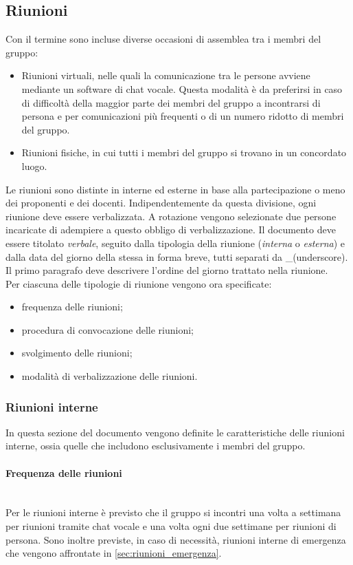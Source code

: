 \subsection{Riunioni}
Con il termine  sono incluse diverse occasioni di assemblea tra i membri del gruppo:
\begin{itemize}
\item Riunioni virtuali, nelle quali la comunicazione tra le persone avviene mediante un software di chat vocale. Questa modalità è da preferirsi in caso di difficoltà della maggior parte dei membri del gruppo a incontrarsi di persona e per comunicazioni più frequenti o di un numero ridotto di membri del gruppo.
\item Riunioni fisiche, in cui tutti i membri del gruppo si trovano in un concordato luogo.	
\end{itemize}
Le riunioni sono distinte in interne ed esterne in base alla partecipazione o meno dei proponenti e dei docenti.
Indipendentemente da questa divisione, ogni riunione deve essere verbalizzata. 
A rotazione vengono selezionate due persone incaricate di adempiere a questo obbligo di verbalizzazione.
Il documento deve essere titolato \textit{verbale}, seguito dalla tipologia della riunione (\textit{interna} o \textit{esterna}) e dalla data del giorno della stessa in forma breve, tutti separati da \_(underscore).\\
Il primo paragrafo deve descrivere l'ordine del giorno trattato nella riunione.\\

Per ciascuna delle tipologie di riunione vengono ora specificate:
\begin{itemize}
	\item frequenza delle riunioni;
	\item procedura di convocazione delle riunioni;
	\item svolgimento delle riunioni;
	\item modalità di verbalizzazione delle riunioni.	 
\end{itemize}

\subsubsection{Riunioni interne}
In questa sezione del documento vengono definite le caratteristiche delle riunioni interne, ossia quelle che includono esclusivamente i membri del gruppo.

\paragraph{Frequenza delle riunioni}\mbox{}\\
Per le riunioni interne è previsto che il gruppo si incontri una volta a settimana per riunioni tramite chat vocale e una volta ogni due settimane per riunioni di persona. Sono inoltre previste, in caso di necessità, riunioni interne di emergenza che vengono affrontate in \sezione \ref{sec:riunioni_emergenza}.

